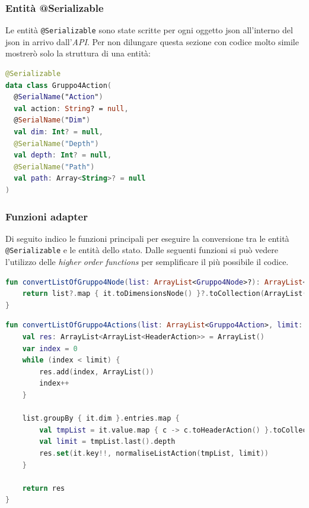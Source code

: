 \subsubsection{Entità @Serializable}
Le entità \verb|@Serializable| sono state scritte per ogni oggetto json all'interno del json in arrivo dall'\emph{API}. Per non dilungare questa sezione con codice molto simile mostrerò solo la struttura di una entità:
\begin{lstlisting}[caption={data class Gruppo4Action}, label={lst:gruppo4action}, language=Kotlin]
@Serializable
data class Gruppo4Action(
  @SerialName("Action")
  val action: String? = null,
  @SerialName("Dim")
  val dim: Int? = null,
  @SerialName("Depth")
  val depth: Int? = null,
  @SerialName("Path")
  val path: Array<String>? = null
)
\end{lstlisting}
\subsubsection{Funzioni adapter}
Di seguito indico le funzioni principali per eseguire la conversione tra le entità \verb|@Serializable| e le entità dello stato. Dalle seguenti funzioni si può vedere l'utilizzo delle \emph{higher order functions} per semplificare il più possibile il codice.

\begin{lstlisting}[caption={Funzione convertListOfGruppo4Node()}, label={lst:gruppo4node}, language=Kotlin]
fun convertListOfGruppo4Node(list: ArrayList<Gruppo4Node>?): ArrayList<DimensionsNode>? {
	return list?.map { it.toDimensionsNode() }?.toCollection(ArrayList())
}
\end{lstlisting}

\begin{lstlisting}[caption={Funzione convertListOfGruppo4Actions()}, label={lst:convertlistofgruppo4actions}, language=Kotlin]
fun convertListOfGruppo4Actions(list: ArrayList<Gruppo4Action>, limit: Int): ArrayList<ArrayList<HeaderAction>> {
	val res: ArrayList<ArrayList<HeaderAction>> = ArrayList()
	var index = 0
	while (index < limit) {
		res.add(index, ArrayList())
		index++
	}
	
	list.groupBy { it.dim }.entries.map {
		val tmpList = it.value.map { c -> c.toHeaderAction() }.toCollection(ArrayList())
		val limit = tmpList.last().depth
		res.set(it.key!!, normaliseListAction(tmpList, limit))
	}
	
	return res
}
\end{lstlisting}

